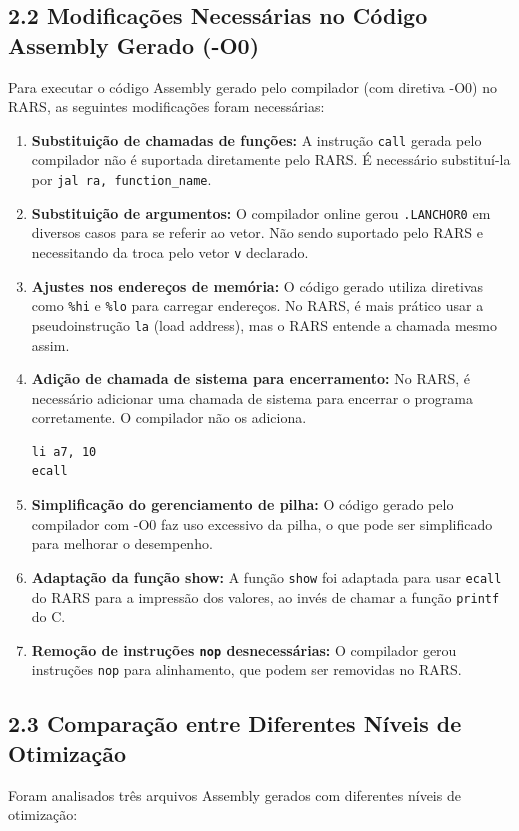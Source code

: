 \documentclass[12pt,a4paper]{article}
\begin{document}
\subsection*{2.2 Modificações Necessárias no Código Assembly Gerado (-O0)}
Para executar o código Assembly gerado pelo compilador (com diretiva -O0) no RARS, as seguintes modificações foram necessárias:
\begin{enumerate}
    \item \textbf{Substituição de chamadas de funções:} A instrução \texttt{call} gerada pelo compilador não é suportada diretamente pelo RARS. É necessário substituí-la por \texttt{jal ra, function\_name}.
    \item \textbf{Substituição de argumentos:} O compilador online gerou \texttt{.LANCHOR0} em diversos casos para se referir ao vetor. Não sendo suportado pelo RARS e necessitando da troca pelo vetor \texttt{v} declarado.
    \item \textbf{Ajustes nos endereços de memória:} O código gerado utiliza diretivas como \texttt{\%hi} e \texttt{\%lo} para carregar endereços. No RARS, é mais prático usar a pseudoinstrução \texttt{la} (load address), mas o RARS entende a chamada mesmo assim.
    \item \textbf{Adição de chamada de sistema para encerramento:} No RARS, é necessário adicionar uma chamada de sistema para encerrar o programa corretamente. O compilador não os adiciona.
    \begin{lstlisting}[language=Assembly]
li a7, 10
ecall
    \end{lstlisting}
    \item \textbf{Simplificação do gerenciamento de pilha:} O código gerado pelo compilador com -O0 faz uso excessivo da pilha, o que pode ser simplificado para melhorar o desempenho.
    \item \textbf{Adaptação da função show:} A função \texttt{show} foi adaptada para usar \texttt{ecall} do RARS para a impressão dos valores, ao invés de chamar a função \texttt{printf} do C.
    \item \textbf{Remoção de instruções \texttt{nop} desnecessárias:} O compilador gerou instruções \texttt{nop} para alinhamento, que podem ser removidas no RARS.
\end{enumerate}

\subsection*{2.3 Comparação entre Diferentes Níveis de Otimização}
Foram analisados três arquivos Assembly gerados com diferentes níveis de otimização:
\end{document}
